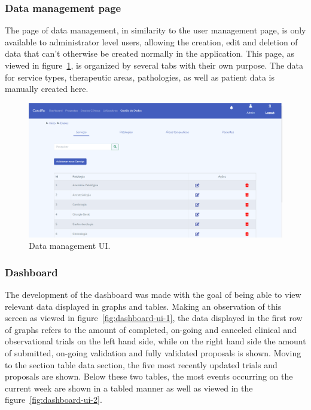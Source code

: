 \subsubsection{Data management page}
The page of data management, in similarity to the user management page, is only available to administrator level users, allowing the creation, edit and deletion of data that can't otherwise be created normally in the application.
This page, as viewed in figure~\ref{fig:data-management-ui}, is organized by several tabs with their own purpose. The data for service types, therapeutic areas, pathologies, as well as patient data is manually created here.

\begin{figure}[H]
    \centering
    \includegraphics[scale=0.5]{Chapters/img/ui/data-management.png}
    \caption{Data management UI.}
    \label{fig:data-management-ui}
\end{figure}


\subsubsection{Dashboard}
The development of the dashboard was made with the goal of being able to view relevant data displayed in graphs and tables. Making an observation of this screen as viewed in figure~\ref{fig:dashboard-ui-1}, the data displayed in the first row of graphs refers to the amount of completed, on-going and canceled clinical and observational trials on the left hand side, while on the right hand side the amount of submitted, on-going validation and fully validated proposals is shown.
Moving to the section table data section, the five most recently updated trials and proposals are shown. Below these two tables, the most events occurring on the current week are shown in a tabled manner as well as viewed in the figure~\ref{fig:dashboard-ui-2}.


